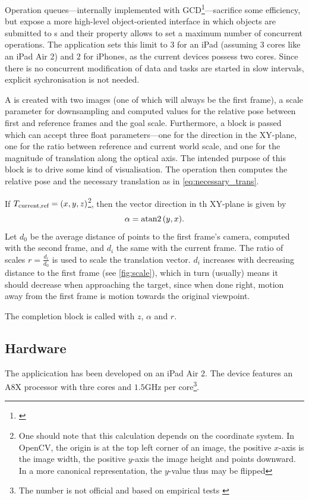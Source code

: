 Operation queues---internally implemented with
GCD\footnote{\citep{nsopgcd}}---sacrifice some efficiency, but expose a more
high-level object-oriented interface in which  objects are
submitted to s and their
 property allows to set a maximum number of
concurrent operations. The application sets this limit to $3$ for an iPad
(assuming $3$ cores like an iPad Air 2) and $2$ for iPhones, as the current
devices possess two cores. Since there is no concurrent modification of data and
tasks are started in slow intervals, explicit sychronisation is not needed.
 
A  is created with two images (one of
which will always be the first frame), a scale parameter for downsampling and
computed values for the relative pose between first and reference frames and the
goal scale. Furthermore, a block is passed which can accept three float
parameters---one for the direction in the XY-plane, one for the ratio between
reference and current world scale, and one for the magnitude of translation along
the optical axis. The intended purpose of this block is to drive some kind of
visualisation. The operation then computes the relative pose and the necessary
translation as in \eqref{eq:necessary_trans}. 

If $T_{\text{current,ref}} = (x,y,z)$\footnote{One should note that this
   calculation depends on the coordinate system. In OpenCV, the origin is at the
   top left corner of an image, the positive $x$-axis is the image width, the
   positive $y$-axis the image height and points downward. In a more canonical
representation, the $y$-value thus may be flipped}, then the vector direction
in th XY-plane is given by 
\begin{equation*}
   \alpha = \atan2{(y,x)}.
\end{equation*}
Let $d_0$ be the average distance of points to the first frame's camera,
computed with the second frame, and $d_i$ the same with the current frame. The
ratio of scales $r=\frac{d_i}{d_0}$ is used to scale the translation vector. $d_i$
increases with decreasing distance to the first frame (see \autoref{fig:scale}),
which in turn (usually) means it should decrease when approaching the target,
since when done right, motion away from the first frame is motion towards the
original viewpoint.

The completion block is called with $z$, $\alpha$ and $r$.

\subsection*{Hardware}

The applicication has been developed on an iPad Air 2. The device features an
A8X processor with thre cores and $1.5$GHz per core\footnote{The number is not
official and based on empirical tests \citep{a8x}}.


